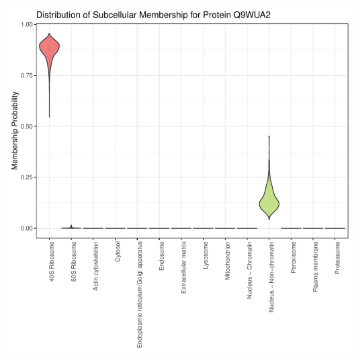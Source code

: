\documentclass[12pt,english]{article}\usepackage[]{graphicx}\usepackage[]{color}
\makeatletter
\def\maxwidth{ %
  \ifdim\Gin@nat@width>\linewidth
    \linewidth
  \else
    \Gin@nat@width
  \fi
}
\newenvironment{knitrout}{}{} %
\makeatother
\begin{document}
\begin{figure}[p]
  \centering
  \begin{subfigure}[t]{0.5\textwidth}
    \centering
\begin{knitrout}
\color{fgcolor}

{\centering \includegraphics[width=\maxwidth]{figure/Q9WUA2-prob-1} 

}



\end{knitrout}
    \caption{}
  \end{subfigure}%
  \begin{subfigure}[t]{0.5\textwidth}
    \centering
\begin{knitrout}
\color{fgcolor}


\end{knitrout}
\end{subfigure}
\end{figure}
\end{document}
